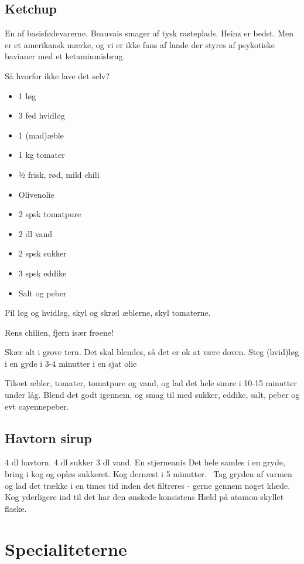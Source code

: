 \documentclass[
]{book}
\providecommand{\tightlist}{%
  \setlength{\itemsep}{0pt}\setlength{\parskip}{0pt}}
\begin{document}
\section{Ketchup}\label{ketchup}

En af basisfødevarerne. Beauvais smager af tysk rasteplads.
Heinz er bedst. Men er et amerikansk mærke, og vi er ikke fans af
lande der styres af psykotiske bavianer med et ketaminmisbrug.

Så hvorfor ikke lave det selv?

\begin{itemize}
\tightlist
\item
  1 løg
\item
  3 fed hvidløg
\item
  1 (mad)æble
\item
  1 kg tomater
\item
  ½ frisk, rød, mild chili
\item
  Olivenolie
\item
  2 spsk tomatpure
\item
  2 dl vand
\item
  2 spsk sukker
\item
  3 spsk eddike
\item
  Salt og peber
\end{itemize}

Pil løg og hvidløg, skyl og skræl æblerne, skyl tomaterne.

Rens chilien, fjern især frøene!

Skær alt i grove tern. Det skal blendes, så det er ok at være doven. Steg (hvid)løg i en gyde i 3-4 minutter i en sjat olie

Tilsæt æbler, tomater, tomatpure og vand, og lad det hele simre i 10-15 minutter under låg. Blend det godt igennem, og smag til med sukker, eddike, salt, peber og evt cayennepeber.

\section{Havtorn sirup}\label{havtorn-sirup}

4 dl havtorn.
4 dl sukker
3 dl vand.
En stjerneanis
Det hele samles i en gryde, bring i kog og opløs sukkeret.
Kog dernæst i 5 minutter.~
Tag gryden af varmen og lad det trække i en times tid inden det filtreres - gerne gennem noget klæde.~
Kog yderligere ind til det har den ønskede konsistens
Hæld på atamon-skyllet flaske.

\chapter{Specialiteterne}\label{specialiteterne}
\end{document}
